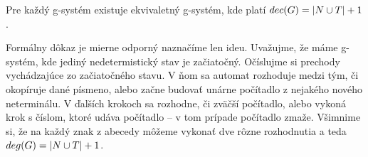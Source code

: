 \begin{veta}
Pre každý g-systém existuje ekvivaletný g-systém, kde platí $dec(G) = |N \cup T| + 1$.
\end{veta}

\begin{dokaz}
Formálny dôkaz je mierne odporný naznačíme len ideu. Uvažujme, že máme g-systém, kde jediný
nedetermistický stav je začiatočný. Očíslujme si prechody vychádzajúce zo začiatočného stavu.
V ňom sa automat rozhoduje medzi tým, či okopíruje dané písmeno, alebo začne budovať unárne
počítadlo z nejakého nového neterminálu. V ďalších krokoch sa rozhodne, či zväčší počítadlo, alebo
vykoná krok s číslom, ktoré udáva počítadlo -- v tom prípade počítadlo zmaže.
Všimnime si, že na každý znak z abecedy môžeme vykonať dve rôzne rozhodnutia a teda $deg(G) = |N
\cup T| + 1$.
\end{dokaz}
